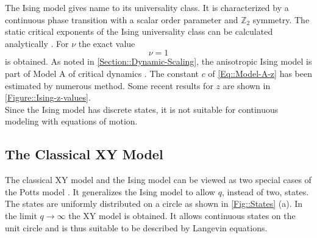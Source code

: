 	The Ising model gives name to its universality class. It is characterized by a continuous phase transition with a scalar order parameter and $\mathbb{Z}_2$ symmetry. The static critical exponents of the Ising universality class can be calculated analytically \cite{cardy1996scaling}. For $\nu$ the exact value
	\begin{equation}
		\nu =	1
	\end{equation}
	is obtained. As noted in \autoref{Section::Dynamic-Scaling}, the anisotropic Ising model is part of Model A of critical dynamics \cite{hohenberg1977theory}. The constant $c$ of \autoref{Eq::Model-A-z} has been estimated by numerous method. Some recent results for $z$ are shown in \autoref{Figure::Ising-z-values}. \\
	
	Since the Ising model has discrete states, it is not suitable for continuous modeling with equations of motion.
	\subsection{The Classical XY Model}
	The classical XY model and the Ising model can be viewed as two special cases of the Potts model \cite{potts1952some}. It generalizes the Ising model to allow $q$, instead of two, states. The states are uniformly distributed on a circle as shown in \autoref{Fig::States} (a). In the limit $q \rightarrow \infty$ the XY model is obtained. It allows continuous states on the unit circle and is thus suitable to be described by Langevin equations. \\
	
